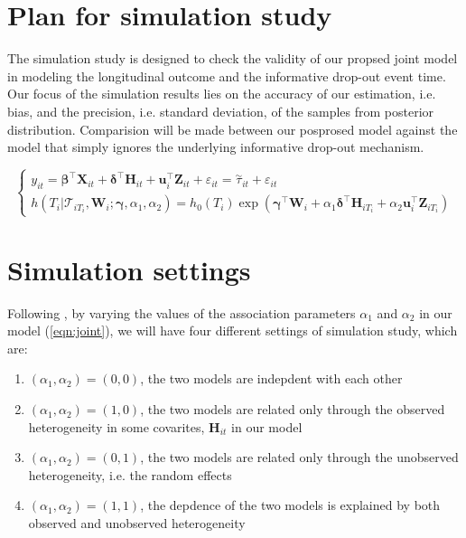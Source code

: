 \documentclass{article}
\begin{document}
\section{Plan for simulation study} 
The simulation study is designed to check the validity of our propsed joint model in modeling the longitudinal outcome and the informative drop-out event time. Our focus of the simulation results lies on the accuracy of our estimation, i.e. bias, and the precision, i.e. standard deviation, of the samples from posterior distribution. Comparision will be made between our posprosed model against the model that simply ignores the underlying informative drop-out mechanism.

\begin{equation}\label{eqn:joint}
\left\{
\begin{array}{l}
y_{it} = \boldsymbol{\beta}^{\top}{\boldsymbol X}_{it} + \boldsymbol{\delta}^{\top}{\boldsymbol H}_{it} + {\boldsymbol u}_i^{\top}{\boldsymbol Z}_{it} + \varepsilon_{it} =\overset{\sim}{\tau}_{it} + \varepsilon_{it}\\
h(T_i|\mathcal{T}_{iT_i}, {\boldsymbol W}_i;  \boldsymbol{\gamma}, \alpha_1, 
\alpha_2) = h_0(T_i)\exp(\boldsymbol{\gamma}^{\top}{\boldsymbol W}_i + \alpha_1\boldsymbol{\delta}^{\top}{\boldsymbol H}_{iT_i} + \alpha_2{\boldsymbol u}_i^{\top}{\boldsymbol Z}_{iT_i})
\end{array}
\right.
\end{equation}


\section{Simulation settings }
Following \citep{farcomeni2014longitudinal}, by varying the values of the association parameters $\alpha_1$ and $\alpha_2$ in our model (\ref{eqn:joint}), we will have four different settings of simulation study, which are:

\begin{enumerate}
\item $(\alpha_1, \alpha_2)=(0, 0)$, the two models are indepdent with each other
\item $(\alpha_1, \alpha_2)=(1, 0)$, the two models are related only through the observed heterogeneity in some covarites, ${\boldsymbol H}_{it}$ in our model
\item $(\alpha_1, \alpha_2)=(0, 1)$, the two models are related only through the unobserved heterogeneity, i.e. the random effects
\item $(\alpha_1, \alpha_2)=(1, 1)$, the depdence of the two models is explained by both observed and unobserved heterogeneity
\end{enumerate}
\end{document}
